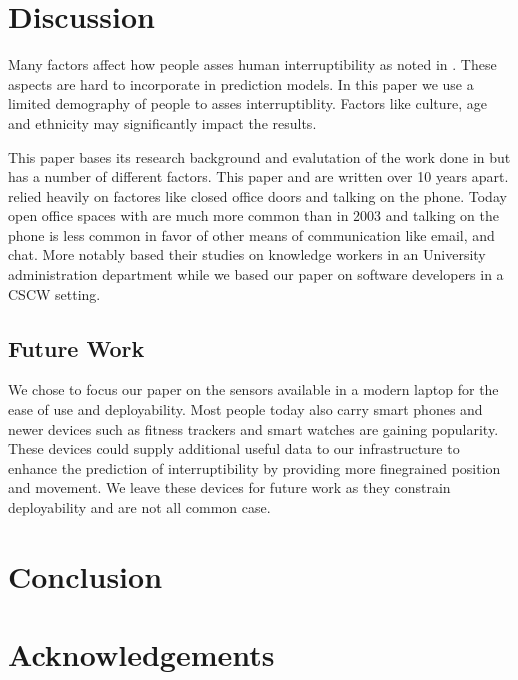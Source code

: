 \documentclass{sigchi}
\begin{document}
\section{Discussion}


Many factors affect how people asses human interruptibility as noted in \cite{Avrahami2007}.
These aspects are hard to incorporate in prediction models.
In this paper we use a limited demography of people to asses interruptiblity.
Factors like culture, age and ethnicity may significantly impact the results.

This paper bases its research background and evalutation of the work done in \cite{fogarty2005predicting} but has a number of different factors. This paper and \cite{fogarty2005predicting} are written over 10 years apart. \cite{fogarty2005predicting} relied heavily on factores like closed office doors and talking on the phone. Today open office spaces with are much more common than in 2003 and talking on the phone is less common in favor of other means of communication like email, and chat. More notably \cite{fogarty2005predicting} based their studies on knowledge workers in an University administration department while we based our paper on software developers in a CSCW setting.

\subsection{Future Work}

We chose to focus our paper on the sensors available in a modern laptop for the ease of use and deployability.
Most people today also carry smart phones and newer devices such as fitness trackers and smart watches are gaining popularity.
These devices could supply additional useful data to our infrastructure to enhance the prediction of interruptibility by providing more finegrained position and movement.
We leave these devices for future work as they constrain deployability and are not all common case.


\section{Conclusion}

\section{Acknowledgements}

\balance



\end{document}
